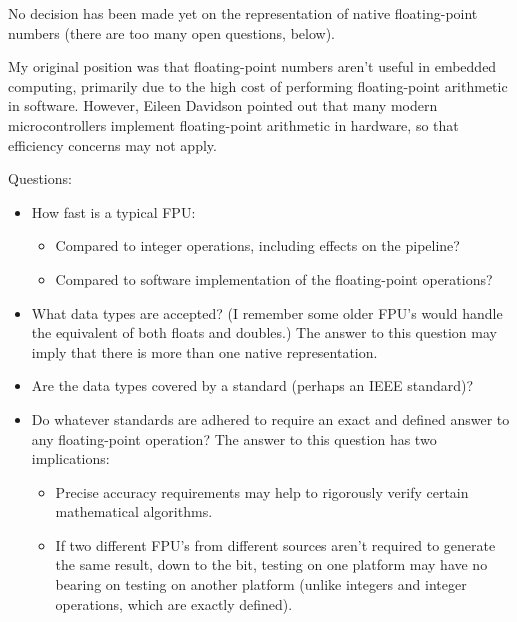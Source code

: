 No decision has been made yet on the representation of 
native floating-point numbers (there are too many open 
questions, below).  

My original position was that floating-point numbers aren't 
useful in embedded computing, primarily due to the high cost 
of performing floating-point arithmetic in software.  
However, Eileen Davidson 
\cite{bibref:i:EileenADavidson} pointed out that many modern 
microcontrollers implement floating-point arithmetic in 
hardware, so that efficiency concerns may not apply.  

Questions:

\begin{itemize}
\item How fast is a typical FPU:
      \begin{itemize}
      \item Compared to integer operations, including
            effects on the
            pipeline?
      \item Compared to software implementation of the
            floating-point
            operations?
      \end{itemize}
\item What data types are accepted?  (I remember some older
      FPU's would handle the equivalent of both
      floats and doubles.)  The answer to this question may
      imply that there is more than one native
      representation.
\item Are the data types covered by a standard (perhaps an
      IEEE standard)?
\item Do whatever standards are adhered to require an
      exact and defined answer to any floating-point
      operation?  The answer to this question has two
      implications:
      \begin{itemize}
      \item Precise accuracy requirements may help to
            rigorously verify certain mathematical
            algorithms.
      \item If two different FPU's from different sources
            aren't required to generate the same result,
            down to the bit, testing on one platform may
            have no bearing on testing on another platform
            (unlike integers and integer operations, which
            are exactly defined).
      \end{itemize}
\end{itemize}


